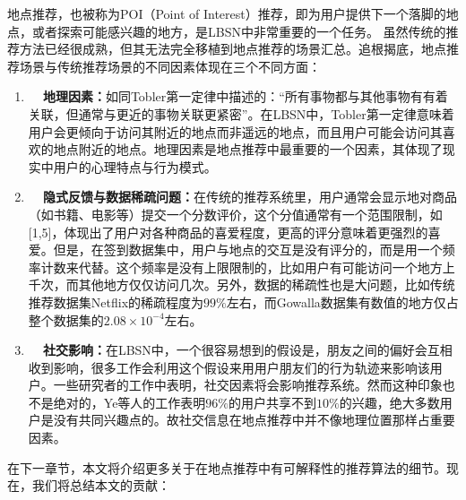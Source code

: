 地点推荐，也被称为POI（Point of Interest）推荐，即为用户提供下一个落脚的地点，或者探索可能感兴趣的地方，是LBSN中非常重要的一个任务。
虽然传统的推荐方法已经很成熟，但其无法完全移植到地点推荐的场景汇总。追根揭底，地点推荐场景与传统推荐场景的不同因素体现在三个不同方面：

\begin{enumerate}
    \item \textbf{~~地理因素：}如同Tobler第一定律中描述的：“所有事物都与其他事物有有着关联，但通常与更近的事物关联更紧密”。在LBSN中，Tobler第一定律意味着用户会更倾向于访问其附近的地点而非遥远的地点，而且用户可能会访问其喜欢的地点附近的地点。地理因素是地点推荐中最重要的一个因素，其体现了现实中用户的心理特点与行为模式。

    \item \textbf{~~隐式反馈与数据稀疏问题：}在传统的推荐系统里，用户通常会显示地对商品（如书籍、电影等）提交一个分数评价，这个分值通常有一个范围限制，如[1,5]，体现出了用户对各种商品的喜爱程度，更高的评分意味着更强烈的喜爱。但是，在签到数据集中，用户与地点的交互是没有评分的，而是用一个频率计数来代替。这个频率是没有上限限制的，比如用户有可能访问一个地方上千次，而其他地方仅仅访问几次。另外，数据的稀疏性也是大问题，比如传统推荐数据集Netflix的稀疏程度为$99\%$左右，而Gowalla数据集有数值的地方仅占整个数据集的$2.08 \times 10 ^ { - 4 }$左右。

    \item \textbf{~~社交影响：}在LBSN中，一个很容易想到的假设是，朋友之间的偏好会互相收到影响，很多工作会利用这个假设来用用户朋友们的行为轨迹来影响该用户。一些研究者的工作中表明，社交因素将会影响推荐系统。然而这种印象也不是绝对的，Ye等人的工作表明$96\%$的用户共享不到$10\%$的兴趣，绝大多数用户是没有共同兴趣点的。故社交信息在地点推荐中并不像地理位置那样占重要因素。
\end{enumerate}





在下一章节，本文将介绍更多关于在地点推荐中有可解释性的推荐算法的细节。现在，我们将总结本文的贡献：

